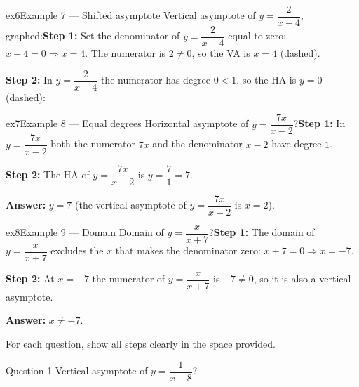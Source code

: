 \documentclass[11pt]{article}
\begin{document}
\begin{example}{ex6}{Example 7 --- Shifted asymptote}
Vertical asymptote of $y=\dfrac{2}{x-4}$, graphed:\soln \textbf{Step 1:} Set the denominator of $y=\dfrac{2}{x-4}$ equal to zero: $x-4=0\Rightarrow x=4$. The numerator is $2\ne0$, so the VA is $x=4$ (dashed).

\textbf{Step 2:} In $y=\dfrac{2}{x-4}$ the numerator has degree $0<1$, so the HA is $y=0$ (dashed):\begin{center}\end{center}
\end{example}

\begin{example}{ex7}{Example 8 --- Equal degrees}
Horizontal asymptote of $y=\dfrac{7x}{x-2}$?\soln \textbf{Step 1:} In $y=\dfrac{7x}{x-2}$ both the numerator $7x$ and the denominator $x-2$ have degree $1$.

\textbf{Step 2:} The HA of $y=\dfrac{7x}{x-2}$ is $y=\dfrac71=7$.

\textbf{Answer:} $y=7$ (the vertical asymptote of $y=\dfrac{7x}{x-2}$ is $x=2$).
\end{example}

\begin{example}{ex8}{Example 9 --- Domain}
Domain of $y=\dfrac{x}{x+7}$?\soln \textbf{Step 1:} The domain of $y=\dfrac{x}{x+7}$ excludes the $x$ that makes the denominator zero: $x+7=0\Rightarrow x=-7$.

\textbf{Step 2:} At $x=-7$ the numerator of $y=\dfrac{x}{x+7}$ is $-7\ne0$, so it is also a vertical asymptote.

\textbf{Answer:} $x\ne-7$.
\end{example}

\clearpage
{}
For each question, show all steps clearly in the space provided.

\begin{qbox}{Question 1}
Vertical asymptote of $y=\dfrac{1}{x-8}$?\workspace{2.4cm}
\end{qbox}
\end{document}
